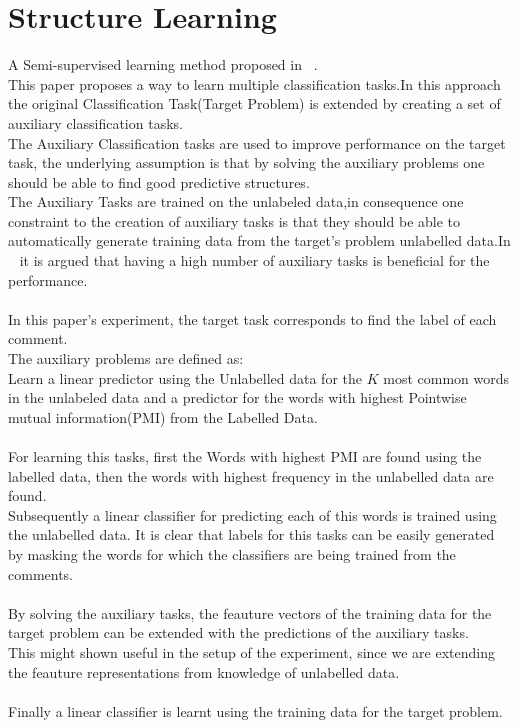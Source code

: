 \documentclass[4pt,a4paper,twocolumn]{article}
\begin{document}
 
\section{Structure Learning}
A Semi-supervised learning method proposed in ~\cite{Ando:2005:FLP:1046920.1194905}.\\
This paper proposes a way to learn multiple classification tasks.In this approach the original Classification Task(Target Problem) is extended by creating a set of auxiliary classification tasks.\\
The Auxiliary Classification tasks are used to improve performance on the target task,
the underlying assumption is that by solving the auxiliary problems one should be able to find good predictive structures.\\
The Auxiliary Tasks are trained on the unlabeled data,in consequence one constraint to the creation of auxiliary tasks is that they should be able to automatically generate training data from the target's problem unlabelled data.In ~\cite{Ando:2005:HSL:1219840.1219841} it is argued that having a high number of auxiliary tasks is beneficial for the performance.\\
\\
In this paper's experiment, the target task corresponds to find the label of each comment.\\
The auxiliary problems are defined as:\\
Learn a linear predictor using the Unlabelled data for the $K$ most common words in the unlabeled data and a predictor for the words with highest Pointwise mutual information(PMI) from the Labelled Data.\\
\\
For learning this tasks, first the Words with highest PMI are found using the labelled data, then the words with highest frequency in the unlabelled data are found.\\
Subsequently a linear classifier for predicting each of this words is trained using the unlabelled data.
It is clear that labels for this tasks can be easily generated by masking the words for which the classifiers are being trained from the comments.\\
\\
By solving the auxiliary tasks, the feauture vectors of the training data for the target problem can be extended with the predictions of the auxiliary tasks.\\
This might shown useful in the setup of the experiment, since we are extending the feauture representations from knowledge of unlabelled data.\\
\\
Finally a linear classifier is learnt using the training data for the target problem.
\end{document}
